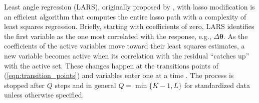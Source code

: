 Least angle regression (LARS), originally proposed by \cite{efron2004least}, with lasso modification is an efficient algorithm that computes the entire lasso path with a complexity of least squares regression. Briefly, starting with coefficients of zero, LARS identifies the first variable as the one most correlated with the response, e.g., $\Delta\boldsymbol{\theta}$. As the coefficients of the active variables move toward their least squares estimates, a new variable becomes active when its correlation with the residual ``catches up'' with the active set. These changes happen at the transitions points of (\ref{eqn:transition_points}) and variables enter one at a time \cite{efron2004least}. The process is stopped after $Q$ steps and in general $Q = \min\{K-1, L\}$ for standardized data unless otherwise specified. 

